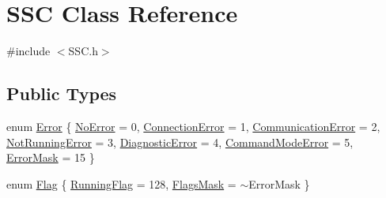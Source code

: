 \hypertarget{class_s_s_c}{}\section{S\+SC Class Reference}
\label{class_s_s_c}


{\ttfamily \#include $<$S\+S\+C.\+h$>$}

\subsection*{Public Types}
\begin{DoxyCompactItemize}
\item 
enum \hyperlink{class_s_s_c_a63403d830673dc853c121d05b72d6ea4}{Error} \{ \newline
\hyperlink{class_s_s_c_a63403d830673dc853c121d05b72d6ea4ad7f78faeab21efd8e7d9cb3e57b1429b}{No\+Error} = 0, 
\hyperlink{class_s_s_c_a63403d830673dc853c121d05b72d6ea4a547abfa645150f1a4cd16ac3b17f1631}{Connection\+Error} = 1, 
\hyperlink{class_s_s_c_a63403d830673dc853c121d05b72d6ea4aab28fb55f92f911197da3ef65a856f6f}{Communication\+Error} = 2, 
\hyperlink{class_s_s_c_a63403d830673dc853c121d05b72d6ea4a78bc1bffd2f4ac8ed9e32085a6bef015}{Not\+Running\+Error} = 3, 
\newline
\hyperlink{class_s_s_c_a63403d830673dc853c121d05b72d6ea4a0e66f195412d0415abc618a7882cc8d9}{Diagnostic\+Error} = 4, 
\hyperlink{class_s_s_c_a63403d830673dc853c121d05b72d6ea4a5394df15b7ba7c8079b9141789673c32}{Command\+Mode\+Error} = 5, 
\hyperlink{class_s_s_c_a63403d830673dc853c121d05b72d6ea4a72fe7b4122769019d0251c29d9ed7e96}{Error\+Mask} = 15
 \}
\item 
enum \hyperlink{class_s_s_c_a95389fc10623e73e03eadd68537cae36}{Flag} \{ \hyperlink{class_s_s_c_a95389fc10623e73e03eadd68537cae36ac786b8fb0917e08dd50a7f5707a7bd37}{Running\+Flag} = 128, 
\hyperlink{class_s_s_c_a95389fc10623e73e03eadd68537cae36ab07017339c262306cffe6214381010de}{Flags\+Mask} = $\sim$\+Error\+Mask
 \}
\end{DoxyCompactItemize}
